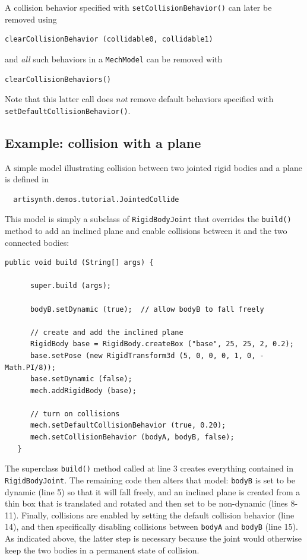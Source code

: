 A collision behavior specified with
{\tt setCollisionBehavior()} can later be removed
using 
%
\begin{lstlisting}[]
  clearCollisionBehavior (collidable0, collidable1)
\end{lstlisting}
%
and {\it all} such behaviors in a {\tt MechModel} can be removed with
%
\begin{lstlisting}[]
  clearCollisionBehaviors()
\end{lstlisting}
%
Note that this latter call does {\it not} remove default behaviors
specified with {\tt setDefaultCollisionBehavior()}.

\subsection{Example: collision with a plane}
\label{JointedCollide:sec}

A simple model illustrating collision between two jointed rigid bodies
and a plane is defined in
%
\begin{verbatim}
  artisynth.demos.tutorial.JointedCollide
\end{verbatim}
%

This model is simply a subclass of {\tt RigidBodyJoint} that
overrides the {\tt build()} method 
to add an inclined plane and enable collisions between it and
the two connected bodies:
%
\lstset{numbers=left}
\begin{lstlisting}[]
   public void build (String[] args) {

      super.build (args);

      bodyB.setDynamic (true);  // allow bodyB to fall freely

      // create and add the inclined plane
      RigidBody base = RigidBody.createBox ("base", 25, 25, 2, 0.2);
      base.setPose (new RigidTransform3d (5, 0, 0, 0, 1, 0, -Math.PI/8));
      base.setDynamic (false);
      mech.addRigidBody (base);

      // turn on collisions
      mech.setDefaultCollisionBehavior (true, 0.20);
      mech.setCollisionBehavior (bodyA, bodyB, false);
   }
\end{lstlisting}
\lstset{numbers=none}

The superclass {\tt build()} method called at line 3 creates
everything contained in {\tt RigidBodyJoint}. The remaining code then
alters that model: {\tt bodyB} is set to be dynamic (line 5) so that
it will fall freely, and an inclined plane is created from a thin box
that is translated and rotated and then set to be non-dynamic
(lines 8-11).  Finally, collisions are enabled by setting the default
collision behavior (line 14), and then specifically disabling
collisions between {\tt bodyA} and {\tt bodyB} (line 15). As indicated
above, the latter step is necessary because the joint would otherwise
keep the two bodies in a permanent state of collision.

